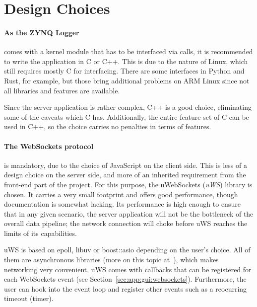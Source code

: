 %
%
\section{Design Choices} %
\label{sec:server:design_choices}

\paragraph{As  the ZYNQ  Logger} comes  with a  kernel module  that has  to be
interfaced via  calls, it  is recommended to write the application
in C or C++. This is due to the nature of Linux, which still requires mostly C
for interfacing. There  are some   interfaces in Python  and Rust,
for example,  but those bring additional  problems on ARM Linux  since not all
libraries and features are available.

Since  the  server application  is  rather  complex,  C++  is a  good  choice,
eliminating some of the caveats  which C has. Additionally, the entire feature
set of C  can be used in C++,  so the choice carries no penalties  in terms of
features.

\paragraph{The  WebSockets  protocol}  is  mandatory, due  to  the  choice  of
JavaScript on the client side.  This is  less of a design choice on the server
side,  and  more of  an  inherited  requirement  from  the front-end  part  of
the  project. For  this  purpose,  the  uWebSockets  (\emph{uWS})  library  is
chosen.  It carries a very small footprint and offers good performance, though
documentation is  somewhat lacking. Its performance  is high enough  to ensure
that in any given scenario, the  server application will not be the bottleneck
of the  overall data pipeline;  the network  connection will choke  before uWS
reaches the limits of its capabilities.

uWS  is  based  on  epoll,  libuv  or  boost::asio  depending  on  the  user's
choice. All  of   them  are  asynchronous   libraries  (more  on   this  topic
at~\cite{uws:async}),  which  makes  networking  very  convenient.  uWS  comes
with  callbacks  that  can  be  registered  for  each  WebSockets  event  (see
Section~\ref{sec:app:gui:websockets}). Furthermore, the user  can hook into the
event loop and register other events such as a reocurring timeout (timer).

